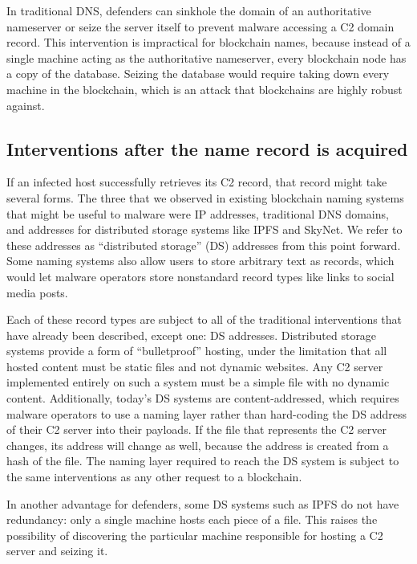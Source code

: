 In traditional DNS, defenders can sinkhole the domain of an 
authoritative nameserver or seize the server itself to 
prevent malware accessing a C2 domain record. This 
intervention is impractical for blockchain names, 
because instead of a single machine acting as the 
authoritative nameserver, every blockchain node has a copy of 
the database. Seizing the database would require taking down 
every machine in the blockchain, which is an attack that 
blockchains are highly robust against.

\subsection{Interventions after the name record is acquired}
\label{sec:interventions_at_name}

If an infected host successfully retrieves its C2 record, 
that record might take several forms. The three that we 
observed in existing blockchain naming systems that might be 
useful to malware were IP addresses, traditional DNS domains, 
and addresses for distributed storage systems like IPFS and 
SkyNet. We refer to these addresses as ``distributed 
storage'' (DS) addresses from this point forward. Some naming 
systems also allow users to store arbitrary text as 
records, which would let malware operators store nonstandard 
record types like links to social media posts. 

Each of these record types are subject to all of the 
traditional interventions that have already 
been described, except one: DS addresses. Distributed storage 
systems provide a form of ``bulletproof'' hosting, under the limitation
that all hosted content must be static files and not dynamic 
websites. Any C2 server implemented entirely on such a 
system must be a simple file with no 
dynamic content. Additionally, today's DS systems are 
content-addressed, which requires malware operators to use a 
naming layer rather than hard-coding the DS address of 
their C2 server into their payloads. If the file that 
represents the C2 server changes, its address will change as 
well, because the address is created from a hash of the file. The naming layer 
required to reach the DS system is subject to the same interventions as any 
other request to a blockchain.

In another advantage for defenders, some DS systems such as IPFS do not 
have redundancy: only a single machine hosts each piece of a file. This raises 
the possibility of discovering the particular machine responsible for hosting a 
C2 server and seizing it. 

